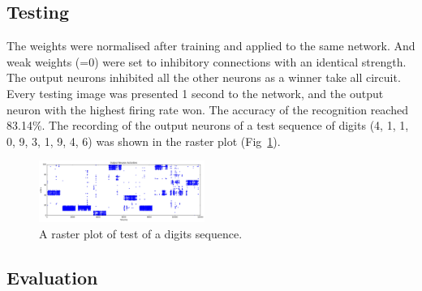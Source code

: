 \subsection{Testing}
The weights were normalised after training and applied to the same network.
And weak weights (=0) were set to inhibitory connections with an identical strength.
The output neurons inhibited all the other neurons as a winner take all circuit.
Every testing image was presented 1 second to the network, and the output neuron with the highest firing rate won.
The accuracy of the recognition reached 83.14\%.
The recording of the output neurons of a test sequence of digits (4, 1, 1, 0, 9, 3, 1, 9, 4, 6) was shown in the raster plot (Fig~\ref{Fig:output}).
\begin{figure}[hbt!]
	\centering
	\includegraphics[width=0.48\textwidth]{images/test300-301.pdf}
	\caption{A raster plot of test of a digits sequence.}
	\label{Fig:output}
\end{figure} 
\subsection{Evaluation}

	